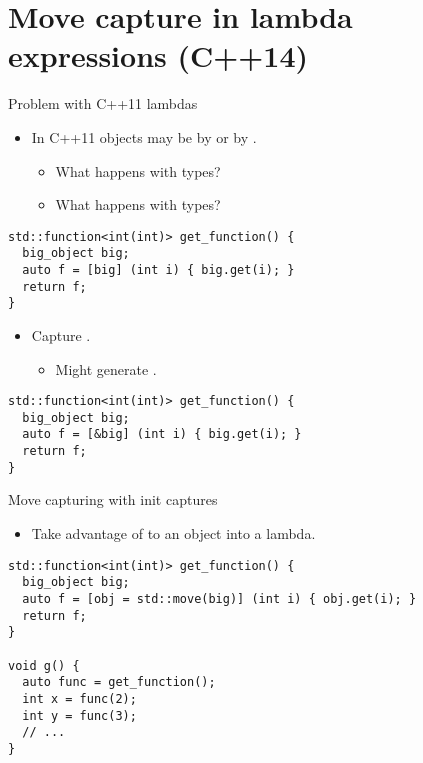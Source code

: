 \section{Move capture in lambda expressions (C++14)}
\label{sec:move-capture-lambda}

\begin{frame}[t,fragile]{Problem with C++11 lambdas}
\begin{itemize}
  \item In C++11 objects may be 
        by  or by .
    \begin{itemize}
      \item What happens with  types?
      \item What happens with  types?
    \end{itemize}
\end{itemize}
\begin{lstlisting}
std::function<int(int)> get_function() {
  big_object big;
  auto f = [big] (int i) { big.get(i); }
  return f;
}
\end{lstlisting}

\pause
\begin{itemize}
  \item Capture .
    \begin{itemize}
      \item Might generate .
    \end{itemize}
\end{itemize}
\begin{lstlisting}
std::function<int(int)> get_function() {
  big_object big;
  auto f = [&big] (int i) { big.get(i); }
  return f;
}
\end{lstlisting}
\end{frame}

\begin{frame}[t,fragile]{Move capturing with init captures}
\begin{itemize}
  \item Take advantage of  to 
        an object into a lambda.
\end{itemize}
\begin{lstlisting}
std::function<int(int)> get_function() {
  big_object big;
  auto f = [obj = std::move(big)] (int i) { obj.get(i); }
  return f;
}

void g() {
  auto func = get_function();
  int x = func(2);
  int y = func(3);
  // ...
}
\end{lstlisting}
\end{frame}
